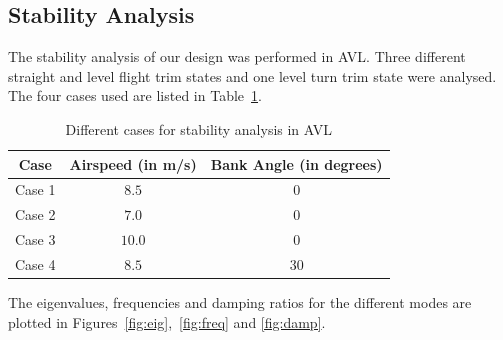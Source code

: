 \documentclass[11pt]{article}
\begin{document}
\subsection{Stability Analysis}

The stability analysis of our design was performed in AVL. Three different straight and level flight trim states and one level turn trim state were analysed. The four cases used are listed in Table~\ref{table:stab-cases}.

\begin{table}[htb]
\begin{center}
\begin{tabular}{|c|c|c|}
\hline
\textbf{Case} & \textbf{Airspeed (in m/s)} & \textbf{Bank Angle (in degrees)} \\ 
\hline
Case 1 &  $8.5$ &  $0$ \\
Case 2 &  $7.0$ &  $0$ \\
Case 3 & $10.0$ &  $0$ \\
Case 4 &  $8.5$ & $30$ \\
\hline
\end{tabular}
\end{center}
\caption{Different cases for stability analysis in AVL}
\label{table:stab-cases} 
\end{table}

The eigenvalues, frequencies and damping ratios for the different modes are plotted in Figures~\ref{fig:eig},~\ref{fig:freq} and \ref{fig:damp}.
\end{document}
